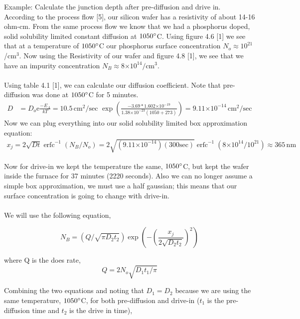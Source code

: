 \documentclass{article}
\newcommand{\me}{\mathrm{e}}
\providecommand{\e}[1]{\ensuremath{\times 10^{#1}}}
\DeclareMathOperator\erfc{erfc}
\begin{document}
Example: Calculate the junction depth after pre-diffusion and drive in. \\
According to the process flow [5], our silicon wafer has a resistivity of about 14-16 ohm-cm. From the same process flow we know that we had a phosphorus doped, solid solubility limited constant diffusion at $1050\degree$C. Using figure 4.6 [1] we see that at a temperature of $1050\degree$C our phosphorus surface concentration $N_o \approx 10^{21}$/$\text{cm}^3$. Now using the Resistivity of our wafer and figure 4.8 [1], we see that we have an impurity concentration $N_B \approx 8\e{14}/\text{cm}^3$. \\ \\
Using table 4.1 [1], we can calculate our diffusion coefficient. Note that pre-diffusion was done at $1050\degree$C for 5 minutes.
\begin{align*}
D &= D_o\me{\frac{-E_A}{kT}} = 10.5 \,\text{cm}^2/\text{sec}\,\, \exp{(\frac{-3.69*1.602\e{-19}}{1.38\e{-23}(1050 + 273)})} = 9.11\e{-14} \, \text{cm}^2/\text{sec}
\end{align*}
Now we can plug everything into our solid solubility limited box approximation equation:
\begin{align*}
x_j = 2\sqrt{Dt}\erfc^{-1}{(N_B/N_o)} = 2\sqrt{(9.11\e{-14})(300\text{sec})} \erfc^{-1}{(8\e{14}/10^{21})} \approx 365 \,\text{nm}
\end{align*}

Now for drive-in we kept the temperature the same, $1050\degree$C, but kept the wafer inside the furnace for 37 minutes (2220 seconds). Also we can no longer assume a simple box approximation, we must use a half gaussian; this means that our surface concentration is going to change with drive-in. \\\\
We will use the following equation,

\begin{equation}
N_B = (Q/\sqrt{\pi D_2t_2})\exp{(-(\frac{x_j}{2\sqrt{D_2t_2}})^2)}
\end{equation}

where Q is the does rate,
\begin{equation}
Q = 2N_o\sqrt{D_1t_1/\pi}
\end{equation}

Combining the two equations and noting that $D_1 = D_2$ because we are using the same temperature, $1050\degree$C, for both pre-diffusion and drive-in ($t_1$ is the pre-diffusion time and $t_2$ is the drive in time),
\end{document}
